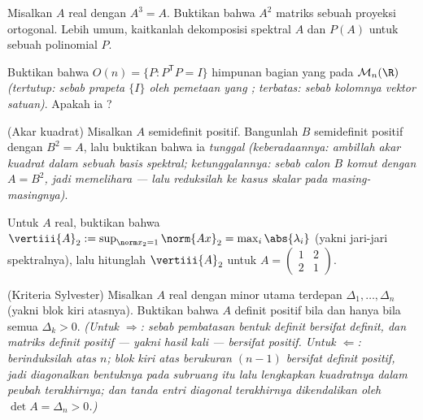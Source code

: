 \begin{exercise}[$\star\star$]\label{exo:b2:quadratic:4}
Misalkan $A$  real dengan $A^3 = A$. Buktikan bahwa $A^2$
matriks sebuah proyeksi ortogonal. Lebih umum, kaitkanlah
dekomposisi spektral $A$ dan $P(A)$ untuk sebuah polinomial $P$.
\end{exercise}

\begin{exercise}[$\star\star$]\label{exo:b2:quadratic:5}
Buktikan bahwa $O(n) = \{P : P^{\mathsf T}P = I\}$ himpunan bagian yang
 pada $\mathcal{M}_n(\R)$ \emph{(tertutup: sebab prapeta $\{I\}$ oleh
pemetaan yang ; terbatas: sebab kolomnya vektor satuan)}. Apakah ia
?
\end{exercise}

\begin{exercise}[$\star\star$]\label{exo:b2:quadratic:6}
(Akar kuadrat) Misalkan $A$  semidefinit positif. Bangunlah
$B$  semidefinit positif dengan $B^2 = A$, lalu buktikan
bahwa ia \emph{tunggal} \emph{(keberadaannya: ambillah akar kuadrat
 dalam sebuah basis spektral; ketunggalannya: sebab calon $B$
komut dengan $A = B^2$, jadi memelihara  --- lalu reduksilah
ke kasus skalar pada masing-masingnya)}.
\end{exercise}

\begin{exercise}[$\star\star$]\label{exo:b2:quadratic:7}
Untuk $A$  real, buktikan bahwa $\vertiii{A}_2 :=
\sup_{\norm x_2 = 1}\norm{Ax}_2 = \max_i \abs{\lambda_i}$
(yakni jari-jari spektralnya), lalu hitunglah $\vertiii{A}_2$ untuk $A =
\begin{pmatrix} 1 & 2\\ 2 & 1\end{pmatrix}$.
\end{exercise}

\begin{exercise}[$\star\star\star$]\label{exo:b2:quadratic:8}
(Kriteria Sylvester) Misalkan $A$  real dengan minor
utama terdepan $\Delta_1, \dots, \Delta_n$ (yakni 
blok kiri atasnya). Buktikan bahwa $A$ definit positif bila dan hanya
bila semua $\Delta_k > 0$. \emph{(Untuk $\Rightarrow$: sebab pembatasan
bentuk definit bersifat definit, dan  matriks definit
positif --- yakni hasil kali  --- bersifat positif.
Untuk $\Leftarrow$: berinduksilah atas $n$; blok kiri atas berukuran $(n-1)$
bersifat definit positif, jadi diagonalkan bentuknya pada subruang itu lalu
lengkapkan kuadratnya dalam peubah terakhirnya; dan tanda entri diagonal
terakhirnya dikendalikan oleh $\det A = \Delta_n > 0$.)}
\end{exercise}

